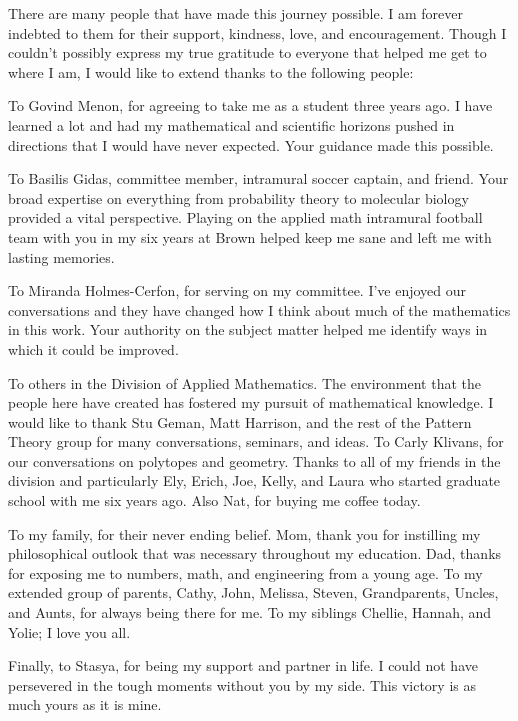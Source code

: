 

There are many people that have made this journey possible. I am forever indebted to them for their support, kindness, love, and encouragement. Though I couldn't possibly express my true gratitude to everyone that helped me get to where I am, I would like to extend thanks to the following people:

To Govind Menon, for agreeing to take me as a student three years ago. I have learned a lot and had my mathematical and scientific horizons pushed in directions that I would have never expected. Your guidance made this possible. 

To Basilis Gidas, committee member, intramural soccer captain, and friend. Your broad expertise on everything from probability theory to molecular biology provided a vital perspective. Playing on the applied math intramural football team with you in my six years at Brown helped keep me sane and left me with lasting memories. 

To Miranda Holmes-Cerfon, for serving on my committee. I've enjoyed our conversations and they have changed how I think about much of the mathematics in this work. Your authority on the subject matter helped me identify ways in which it could be improved.

To others in the Division of Applied Mathematics. The environment that the people here have created has fostered my pursuit of mathematical knowledge. I would like to thank Stu Geman, Matt Harrison, and the rest of the Pattern Theory group for many conversations, seminars, and ideas. To Carly Klivans, for our conversations on polytopes and geometry. Thanks to all of my friends in the division and particularly Ely, Erich, Joe, Kelly, and Laura who started graduate school with me six years ago. Also Nat, for buying me coffee today. 

To my family, for their never ending belief. Mom, thank you for instilling my philosophical outlook that was necessary throughout my education. Dad, thanks for exposing me to numbers, math, and engineering from a young age. To my extended group of parents, Cathy, John, Melissa, Steven, Grandparents, Uncles, and Aunts, for always being there for me. To my siblings Chellie, Hannah, and Yolie; I love you all.

Finally, to Stasya, for being my support and partner in life. I could not have persevered in the tough moments without you by my side. This victory is as much yours as it is mine.

